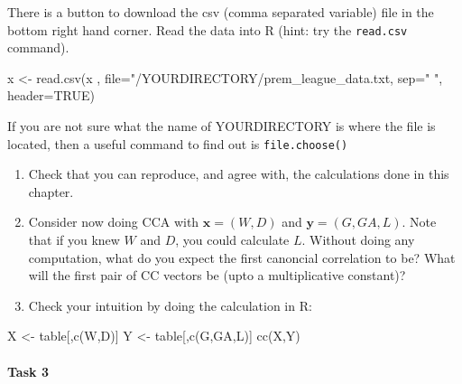 \documentclass[
]{book}
\newenvironment{Shaded}{\begin{snugshade}}{\end{snugshade}}
\newcommand{\AttributeTok}[1]{\textcolor[rgb]{0.77,0.63,0.00}{#1}}
\newcommand{\FunctionTok}[1]{\textcolor[rgb]{0.00,0.00,0.00}{#1}}
\newcommand{\NormalTok}[1]{#1}
\newcommand{\OtherTok}[1]{\textcolor[rgb]{0.56,0.35,0.01}{#1}}
\newcommand{\StringTok}[1]{\textcolor[rgb]{0.31,0.60,0.02}{#1}}
\theoremstyle{definition}
\theoremstyle{definition}
\theoremstyle{definition}
\theoremstyle{definition}
\theoremstyle{remark}
\begin{document}
There is a button to download the csv (comma separated variable) file in the bottom right hand corner. Read the data into R (hint: try the \texttt{read.csv} command).

\begin{Shaded}
\begin{Highlighting}[]
\NormalTok{x }\OtherTok{\textless{}{-}} \FunctionTok{read.csv}\NormalTok{(x , }\AttributeTok{file=}\StringTok{"/YOURDIRECTORY/prem\_league\_data.txt, }
\StringTok{sep="} \StringTok{", header=TRUE)}
\end{Highlighting}
\end{Shaded}

If you are not sure what the name of YOURDIRECTORY is where the file is located, then a useful command to find out is \texttt{file.choose()}

\begin{enumerate}
\def\labelenumi{\roman{enumi}.}
\item
  Check that you can reproduce, and agree with, the calculations done in this chapter.
\item
  Consider now doing CCA with \(\mathbf x=(W,D)\) and \(\mathbf y=(G,GA, L)\). Note that if you knew \(W\) and \(D\), you could calculate \(L\). Without doing any computation, what do you expect the first canoncial correlation to be? What will the first pair of CC vectors be (upto a multiplicative constant)?
\item
  Check your intuition by doing the calculation in R:
\end{enumerate}

\begin{Shaded}
\begin{Highlighting}[]
\NormalTok{X }\OtherTok{\textless{}{-}}\NormalTok{ table[,}\FunctionTok{c}\NormalTok{(}\StringTok{\textquotesingle{}W\textquotesingle{}}\NormalTok{,}\StringTok{\textquotesingle{}D\textquotesingle{}}\NormalTok{)] }
\NormalTok{Y }\OtherTok{\textless{}{-}}\NormalTok{ table[,}\FunctionTok{c}\NormalTok{(}\StringTok{\textquotesingle{}G\textquotesingle{}}\NormalTok{,}\StringTok{\textquotesingle{}GA\textquotesingle{}}\NormalTok{,}\StringTok{\textquotesingle{}L\textquotesingle{}}\NormalTok{)] }
\FunctionTok{cc}\NormalTok{(X,Y)}
\end{Highlighting}
\end{Shaded}

\hypertarget{task-3}{%
\paragraph*{Task 3}\label{task-3}}
\end{document}
